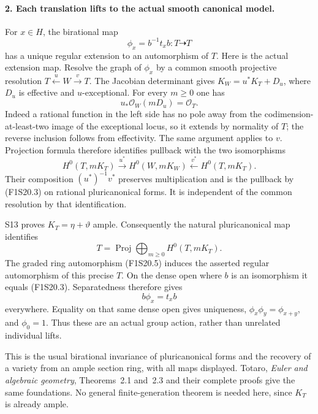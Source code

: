 \paragraph{2. Each translation lifts to the actual smooth canonical model.}
For $x\in H$, the birational map
\[
                       \phi_x=b^{-1}t_xb:T\dashrightarrow T
 \tag{F1S20.3}
\]
has a unique regular extension to an automorphism of $T$.
Here is the actual extension map. Resolve the graph of
$\phi_x$ by a common smooth projective resolution
$T\xleftarrow{u}W\xrightarrow{v}T$. The Jacobian determinant
gives $K_W=u^*K_T+D_u$, where $D_u$ is effective and
$u$-exceptional. For every $m\ge0$ one has
\[
                      u_*\mathcal O_W(mD_u)=\mathcal O_T.
 \tag{F1S20.4}
\]
Indeed a rational function in the left side has no pole
away from the codimension-at-least-two image of the
exceptional locus, so it extends by normality of $T$;
the reverse inclusion follows from effectivity. The same
argument applies to $v$. Projection formula therefore
identifies pullback with the two isomorphisms
\[
 H^0(T,mK_T)\xrightarrow{u^*}H^0(W,mK_W)
                  \xleftarrow{v^*}H^0(T,mK_T).
 \tag{F1S20.5}
\]
Their composition $(u^*)^{-1}v^*$ preserves multiplication
and is the pullback by (F1S20.3) on rational pluricanonical
forms. It is independent of the common resolution by that
identification.

S13 proves $K_T=\eta+\vartheta$ ample. Consequently the
natural pluricanonical map identifies
\[
                  T=\operatorname{Proj}
                       \bigoplus_{m\ge0}H^0(T,mK_T).
 \tag{F1S20.6}
\]
The graded ring automorphism (F1S20.5) induces the asserted
regular automorphism of this precise $T$. On the dense open
where $b$ is an isomorphism it equals (F1S20.3). Separatedness
therefore gives
\[
                           b\phi_x=t_xb
 \tag{F1S20.7}
\]
everywhere. Equality on that same dense open gives uniqueness,
$\phi_x\phi_y=\phi_{x+y}$, and $\phi_0=1$. Thus these are
an actual group action, rather than unrelated individual lifts.

This is the usual birational invariance of pluricanonical
forms and the recovery of a variety from an ample section
ring, with all maps displayed. Totaro, \emph{Euler and
algebraic geometry}, Theorems~2.1 and~2.3 and their complete
proofs give the same foundations. No general finite-generation
theorem is needed here, since $K_T$ is already ample.

